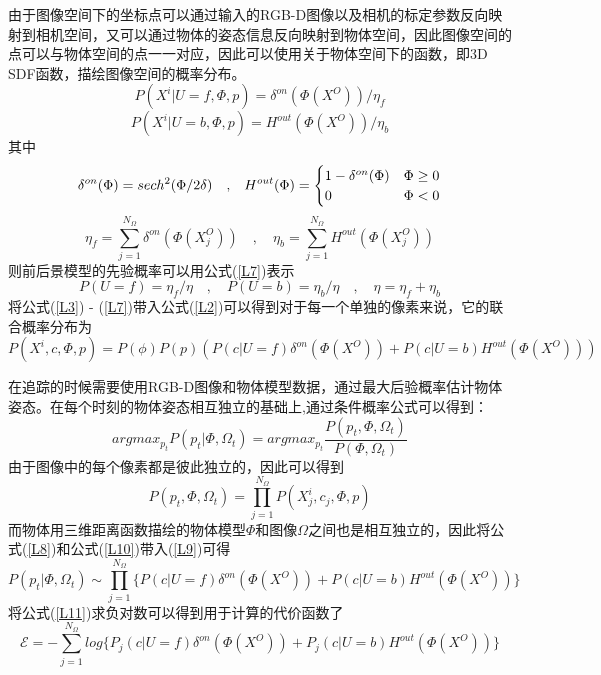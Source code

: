 由于图像空间下的坐标点可以通过输入的RGB-D图像以及相机的标定参数反向映射到相机空间，又可以通过物体的姿态信息反向映射到物体空间，因此图像空间的点可以与物体空间的点一一对应，因此可以使用关于物体空间下的函数，即3D SDF函数，描绘图像空间的概率分布。
\begin{equation}
 P(X^i|U=f, \Phi, p)=\delta^{on}(\Phi(X^O))/\eta_f\label{L3}
\end{equation}
\begin{equation}
 P(X^i|U=b, \Phi, p)=H^{out}(\Phi(X^O))/\eta_b\label{L4}
\end{equation}
其中
\begin{equation} \label{L5}
 \delta^{on}(\Phi)=sech^2(\Phi/2\delta) \quad\mathrm{,}\quad
 H^{out}(\Phi)=
 \begin{cases}
    1-\delta^{on}(\Phi) &\Phi\geq0\cr
    0 &\Phi<0
\end{cases}
\end{equation}
\begin{equation}\label{L6}
 \eta_f=\sum_{j=1}^{N_\Omega}\delta^{on}(\Phi(X_j^O))
\quad\mathrm{,}\quad
 \eta_b=\sum_{j=1}^{N_\Omega}H^{out}(\Phi(X_j^O))
\end{equation}
则前后景模型的先验概率可以用公式(\ref{L7})表示
\begin{equation}\label{L7}
 P(U=f)=\eta_f/\eta \quad\mathrm{,}\quad  P(U=b)=\eta_b/\eta \quad\mathrm{,}\quad  \eta=\eta_f+\eta_b
\end{equation}
将公式(\ref{L3}) - (\ref{L7})带入公式(\ref{L2})可以得到对于每一个单独的像素来说，它的联合概率分布为
\begin{equation}\label{L8}
 P(X^i, c, \Phi, p) = P(\phi)P(p)(P(c|U=f)\delta^{on}(\Phi(X^O)) + P(c|U=b)H^{out}(\Phi(X^O)))
\end{equation}

在追踪的时候需要使用RGB-D图像和物体模型数据，通过最大后验概率估计物体姿态。在每个时刻的物体姿态相互独立的基础上,通过条件概率公式可以得到：
\begin{equation}\label{L9}
argmax_{p_t}P(p_t|\Phi,\Omega_t) = argmax_{p_t}\frac{P(p_t,\Phi,\Omega_t)}{P(\Phi,\Omega_t)}
\end{equation}
由于图像中的每个像素都是彼此独立的，因此可以得到
\begin{equation}\label{L10}
P(p_t,\Phi,\Omega_t)=\prod_{j=1}^{N_\Omega}P(X_j^i, c_j, \Phi, p)
\end{equation}
而物体用三维距离函数描绘的物体模型$\Phi$和图像$\Omega$之间也是相互独立的，因此将公式(\ref{L8})和公式(\ref{L10})带入(\ref{L9})可得
\begin{equation}\label{L11}
P(p_t|\Phi,\Omega_t) \sim \prod_{j=1}^{N_\Omega}\Big\{P(c|U=f)\delta^{on}(\Phi(X^O)) + P(c|U=b)H^{out}(\Phi(X^O))\Big\}
\end{equation}
将公式(\ref{L11})求负对数可以得到用于计算的代价函数了
\begin{equation}\label{L12}
\mathscr{E} = -\sum_{j=1}^{N_\Omega}log\Big\{P_j(c|U=f)\delta^{on}(\Phi(X^O)) + P_j(c|U=b)H^{out}(\Phi(X^O))\Big\}
\end{equation}

